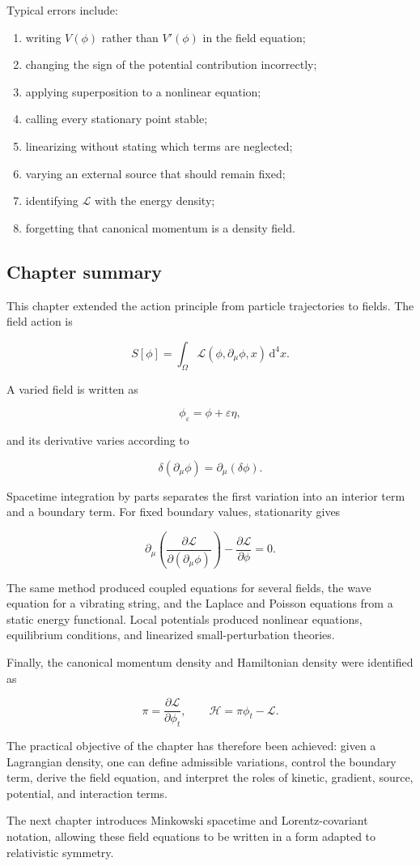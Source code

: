 Typical errors include:

\begin{enumerate}
    \item writing \(V(\phi)\) rather than \(V'(\phi)\) in the field equation;
    \item changing the sign of the potential contribution incorrectly;
    \item applying superposition to a nonlinear equation;
    \item calling every stationary point stable;
    \item linearizing without stating which terms are neglected;
    \item varying an external source that should remain fixed;
    \item identifying \(\mathcal{L}\) with the energy density;
    \item forgetting that canonical momentum is a density field.
\end{enumerate}

\subsection{Chapter summary}

This chapter extended the action principle from particle trajectories to fields. The field action is

\[
S[\phi]
=
\int_{\Omega}
\mathcal{L}(\phi,\partial_{\mu}\phi,x)
\,\mathrm{d}^{4}x.
\]

A varied field is written as

\[
\phi_{\varepsilon}
=
\phi+
\varepsilon\eta,
\]

and its derivative varies according to

\[
\delta(\partial_{\mu}\phi)
=
\partial_{\mu}(\delta\phi).
\]

Spacetime integration by parts separates the first variation into an interior term and a boundary term. For fixed boundary values, stationarity gives

\[
\boxed{
\partial_{\mu}
\left(
\frac{\partial\mathcal{L}}
{\partial(\partial_{\mu}\phi)}
\right)
-
\frac{\partial\mathcal{L}}{\partial\phi}
=0
}.
\]

The same method produced coupled equations for several fields, the wave equation for a vibrating string, and the Laplace and Poisson equations from a static energy functional. Local potentials produced nonlinear equations, equilibrium conditions, and linearized small-perturbation theories.

Finally, the canonical momentum density and Hamiltonian density were identified as

\[
\pi
=
\frac{\partial\mathcal{L}}
{\partial\phi_{t}},
\qquad
\mathcal{H}
=
\pi\phi_{t}-\mathcal{L}.
\]

The practical objective of the chapter has therefore been achieved: given a Lagrangian density, one can define admissible variations, control the boundary term, derive the field equation, and interpret the roles of kinetic, gradient, source, potential, and interaction terms.

The next chapter introduces Minkowski spacetime and Lorentz-covariant notation, allowing these field equations to be written in a form adapted to relativistic symmetry.